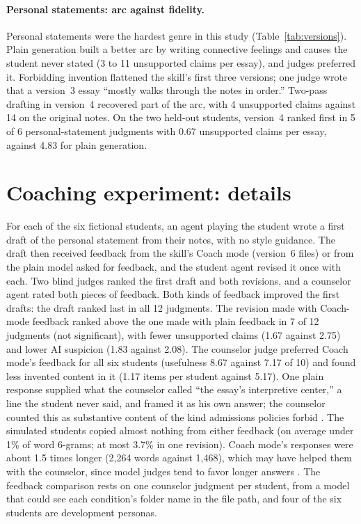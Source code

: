 \documentclass[11pt]{article}
\begin{document}
\paragraph{Personal statements: arc against fidelity.} Personal statements were the hardest genre in this study (Table~\ref{tab:versions}). Plain generation built a better arc by writing connective feelings and causes the student never stated (3 to 11 unsupported claims per essay), and judges preferred it. Forbidding invention flattened the skill's first three versions; one judge wrote that a version~3 essay ``mostly walks through the notes in order.'' Two-pass drafting in version~4 recovered part of the arc, with 4 unsupported claims against 14 on the original notes. On the two held-out students, version~4 ranked first in 5 of 6 personal-statement judgments with 0.67 unsupported claims per essay, against 4.83 for plain generation.

\FloatBarrier
\section{Coaching experiment: details}
\label{sec:appendix-coach}

For each of the six fictional students, an agent playing the student wrote a first draft of the personal statement from their notes, with no style guidance. The draft then received feedback from the skill's Coach mode (version~6 files) or from the plain model asked for feedback, and the student agent revised it once with each. Two blind judges ranked the first draft and both revisions, and a counselor agent rated both pieces of feedback. Both kinds of feedback improved the first drafts: the draft ranked last in all 12 judgments. The revision made with Coach-mode feedback ranked above the one made with plain feedback in 7 of 12 judgments (not significant), with fewer unsupported claims (1.67 against 2.75) and lower AI suspicion (1.83 against 2.08). The counselor judge preferred Coach mode's feedback for all six students (usefulness 8.67 against 7.17 of 10) and found less invented content in it (1.17 items per student against 5.17). One plain response supplied what the counselor called ``the essay's interpretive center,'' a line the student never said, and framed it as his own answer; the counselor counted this as substantive content of the kind admissions policies forbid \citep{commonapp2023fraud,yale2026ai}. The simulated students copied almost nothing from either feedback (on average under 1\% of word 6-grams; at most 3.7\% in one revision). Coach mode's responses were about 1.5 times longer (2,264 words against 1,468), which may have helped them with the counselor, since model judges tend to favor longer answers \citep{zheng2023judging}. The feedback comparison rests on one counselor judgment per student, from a model that could see each condition's folder name in the file path, and four of the six students are development personas.
\end{document}
